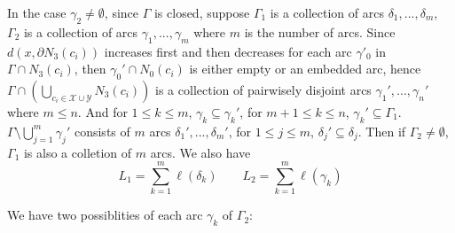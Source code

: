 \documentclass[11pt, a4paper]{article}
\theoremstyle{definition}
\theoremstyle{remark}
\newcommand{\calx}{\mathcal{X}}
\newcommand{\caly}{\mathcal{Y}}
\newcommand{\bracket}[1]{\left( #1 \right)}
\begin{document}
In the case $\gamma_2\neq\emptyset$, since $\Gamma$ is closed, suppose $\Gamma_1$ is a collection of arcs $\delta_1,...,\delta_m$, $\Gamma_2$ is a collection of arcs $\gamma_1,...,\gamma_m$ where $m$ is the number of arcs. Since $d(x,\partial N_3(c_i))$ increases first and then decreases for each arc $\gamma'_0$ in $\Gamma\cap N_3(c_i)$, then $\gamma_0'\cap N_0(c_i)$ is either empty or an embedded arc, hence $\Gamma\cap\bracket{\bigcup_{c_i\in\calx\cup\caly}N_3(c_i)}$ is a collection of pairwisely disjoint arcs $\gamma_1',...,\gamma_n'$ where $m\leqslant n$. And for $1\leqslant k\leqslant m$, $\gamma_k\subseteq\gamma_k'$, for $m+1\leqslant k\leqslant n$, $\gamma_k'\subseteq\Gamma_1$. $\Gamma\setminus\bigcup_{j=1}^{m}\gamma_j'$ consists of $m$ arcs $\delta_1',...,\delta_m'$, for $1\leqslant j\leqslant m$, $\delta_j'\subseteq\delta_j$. Then if $\Gamma_2\neq\emptyset$, $\Gamma_1$ is also a colletion of $m$ arcs. We also have
$$L_1=\sum_{k=1}^{m}\ell(\delta_k)\qquad L_2=\sum_{k=1}^{m}\ell(\gamma_k)$$



We have two possiblities of each arc $\gamma_k$ of $\Gamma_2$:
\end{document}
